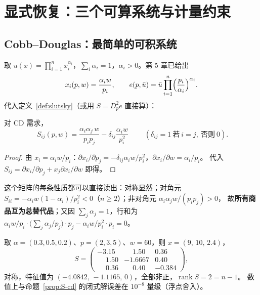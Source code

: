 \section{显式恢复：三个可算系统与计量约束}

\subsection{Cobb--Douglas：最简单的可积系统}

取 $u(x)=\prod_{i=1}^{n}x_i^{\alpha_i}$，$\sum_i\alpha_i=1$，$\alpha_i>0$。第 5 章已给出
\[
 x_i(p,w)=\frac{\alpha_iw}{p_i},\qquad
 e(p,\bar u)=\bar u\prod_{i=1}^{n}\Bigl(\frac{p_i}{\alpha_i}\Bigr)^{\alpha_i}.
\]
代入定义~\ref{def:slutsky}（或用 $S=D_p^2e$ 直接算）：

\begin{proposition}[CD 的 Slutsky 矩阵]\label{prop:S-cd}
对 CD 需求，
\[
 \boxed{\;S_{ij}(p,w)=\frac{\alpha_i\alpha_j\,w}{p_ip_j}-\delta_{ij}\frac{\alpha_iw}{p_i^{2}}\;}
 \qquad(\delta_{ij}=1\ \text{若}\ i=j,\ \text{否则}\ 0).
\]
\end{proposition}

\begin{proof}
由 $x_i=\alpha_iw/p_i$：$\partial x_i/\partial p_j=-\delta_{ij}\alpha_iw/p_i^2$，$\partial x_i/\partial w=\alpha_i/p_i$。
代入 $S_{ij}=\partial x_i/\partial p_j+x_j\partial x_i/\partial w$ 即得。
\end{proof}

这个矩阵的每条性质都可以直接读出：对称显然；对角元
$S_{ii}=-\alpha_iw(1-\alpha_i)/p_i^2<0$（$n\ge2$）；非对角元 $\alpha_i\alpha_jw/(p_ip_j)>0$，
故\textbf{所有商品互为总替代品}；又因 $\sum_j\alpha_j=1$，行和为
$\alpha_iw/p_i\cdot\bigl(\sum_j\alpha_j/p_j\bigr)\cdot p_j-\alpha_iw/p_i^2\cdot p_i=0$。

\begin{example}[数值验证]\label{ex:cd-num}
取 $\alpha=(0.3,0.5,0.2)$、$p=(2,3,5)$、$w=60$，则 $x=(9,\,10,\,2.4)$，
\[
 S=\begin{pmatrix}
 -3.15 & \phantom{-}1.50 & 0.36\\
 \phantom{-}1.50 & -1.6667 & 0.40\\
 \phantom{-}0.36 & \phantom{-}0.40 & -0.384
 \end{pmatrix},
\]
对称，特征值为 $(-4.0842,\,-1.1165,\,0)$，全部非正，$\operatorname{rank}S=2=n-1$。
数值上与命题~\ref{prop:S-cd} 的闭式解误差在 $10^{-8}$ 量级（浮点舍入）。
\end{example}


